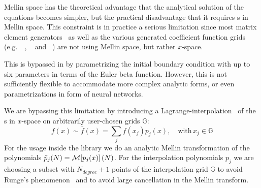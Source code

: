 Mellin space has the theoretical advantage that the analytical solution of the
equations becomes simpler, but the practical disadvantage that it requires
\pdf{}s in Mellin space. 
This constraint is in practice a serious limitation since most matrix element
generators~\cite{Buckley:2011ms} as well as the various generated coefficient
function grids (e.g.\ \pineappl{}~\cite{Carrazza_2020,christopher_schwan_2022_5846421},
\appl{}~\cite{Carli:2010rw} and \fastnlo{}~\cite{Britzger:2012bs}) are not
using Mellin space, but rather $x$-space.

This is bypassed in \pegasus{} by parametrizing the initial boundary condition
with up to six parameters in terms of the Euler beta function.
However, this is not sufficiently flexible to accommodate more complex analytic
forms, or even parametrizations in form of neural networks.

We are bypassing this limitation by introducing a Lagrange-interpolation~\cite{LagrangeInterpol,suli2003introduction} of the
\pdf{}s in $x$-space on arbitrarily user-chosen grids $\mathbb G$:
\begin{equation}
    f(x) \sim \bar f(x) = \sum_{j} f(x_j) p_j(x),  \quad \text{with}\,x_j\in \mathbb G
\end{equation}
For the usage inside the library we do an analytic Mellin transformation of the polynomials $\tilde p_j(N) = \mathcal{M}\qty[p_j(x)](N)$.
For the interpolation polynomials $p_j$ we are choosing a subset with $N_{degree} + 1$ points of the interpolation grid $\mathbb G$
to avoid Runge's phenomenon~\cite{zbMATH02662492,suli2003introduction} and to avoid large cancellation in the Mellin transform.
